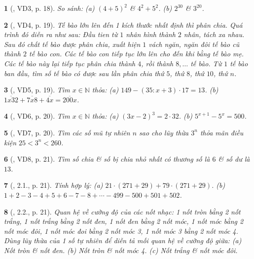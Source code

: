 \documentclass{article}
\newtheorem{baitoan}{}
\begin{document}
\begin{baitoan}[\cite{Binh_boi_duong_Toan_6_tap_1}, VD3, p. 18]
	So sánh: (a) $(4 + 5)^2$ \& $4^2 + 5^2$. (b) $2^{30}$ \& $3^{20}$.
\end{baitoan}

\begin{baitoan}[\cite{Binh_boi_duong_Toan_6_tap_1}, VD4, p. 19]
	Tế bào lớn lên đến 1 kích thước nhất định thì phân chia. Quá trình đó diễn ra như sau: Đầu tien từ $1$ nhân hình thành $2$ nhân, tách xa nhau. Sau đó chất tế bào được phân chia, xuất hiện $1$ vách ngăn, ngăn đôi tế bào cũ thành $2$ tế bào con. Các tế bào con tiếp tục lớn lên cho đến khi bằng tế bào mẹ. Các tế bào này lại tiếp tục phân chia thành $4$, rồi thành $8,\ldots$ tế bào. Từ $1$ tế bào ban đầu, tìm số tế bào có được sau lần phân chia thứ $5$, thứ $8$, thứ $10$, thứ $n$.
\end{baitoan}

\begin{baitoan}[\cite{Binh_boi_duong_Toan_6_tap_1}, VD5, p. 19]
	Tìm $x\in\mathbb{N}$ thỏa: (a) $149 - (35:x + 3)\cdot17 = 13$. (b) $\overline{1x32} + \overline{7x8} + \overline{4x} = \overline{200x}$.
\end{baitoan}

\begin{baitoan}[\cite{Binh_boi_duong_Toan_6_tap_1}, VD6, p. 20]
	Tìm $x\in\mathbb{N}$ thỏa: (a) $(3x - 2)^3 = 2\cdot32$. (b) $5^{x+1} - 5^x = 500$.
\end{baitoan}

\begin{baitoan}[\cite{Binh_boi_duong_Toan_6_tap_1}, VD7, p. 20]
	Tìm các số mũ tự nhiên $n$ sao cho lũy thừa $3^n$ thỏa mãn điều kiện $25 < 3^n < 260$.
\end{baitoan}

\begin{baitoan}[\cite{Binh_boi_duong_Toan_6_tap_1}, VD8, p. 21]
	Tìm số chia \& số bị chia nhỏ nhất có thương số là $6$ \& số dư là $13$.
\end{baitoan}

\begin{baitoan}[\cite{Binh_boi_duong_Toan_6_tap_1}, 2.1., p. 21]
	Tính hợp lý: (a) $21\cdot(271 + 29) + 79\cdot(271 + 29)$. (b) $1 + 2 - 3 - 4 + 5 + 6 - 7 - 8 + \cdots - 499 - 500 + 501 + 502$.
\end{baitoan}

\begin{baitoan}[\cite{Binh_boi_duong_Toan_6_tap_1}, 2.2., p. 21]
	Quan hệ về cường độ của các nốt nhạc: 1 nốt tròn bằng 2 nốt trắng, 1 nốt trắng bằng 2 nốt đen, 1 nốt đen bằng 2 nốt móc, 1 nốt móc bằng 2 nốt móc đôi, 1 nốt móc đoi bằng 2 nốt móc 3, 1 nốt móc 3 bằng 2 nốt móc 4. Dùng lũy thừa của 1 số tự nhiên để diễn tả mối quan hệ về cường độ giữa: (a) Nốt tròn \& nốt đen. (b) Nốt tròn \& nốt móc 4. (c) Nốt trắng \& nốt móc đôi.
\end{baitoan}
\end{document}
